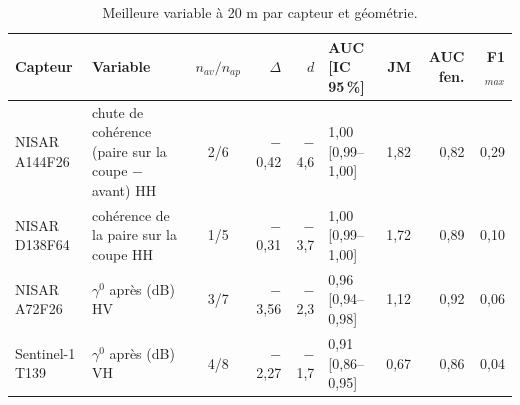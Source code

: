 \begin{table}[htbp]
\centering
\scriptsize
\caption{Meilleure variable à 20 m par capteur et géométrie.}
\label{tab-best}
\begin{tabular}{llcrrlrrr}
\toprule
Capteur & Variable & $n_{av}/n_{ap}$ & $\Delta$ & $d$ & AUC [IC 95\,\%] & JM & AUC fen. & F1$_{max}$ \\
\midrule
NISAR A144F26 & chute de cohérence (paire sur la coupe $-$ avant) HH & 2/6 & $-$0{,}42 & $-$4{,}6 & 1{,}00 [0{,}99--1{,}00] & 1{,}82 & 0{,}82 & 0{,}29 \\
\addlinespace
NISAR D138F64 & cohérence de la paire sur la coupe HH & 1/5 & $-$0{,}31 & $-$3{,}7 & 1{,}00 [0{,}99--1{,}00] & 1{,}72 & 0{,}89 & 0{,}10 \\
\addlinespace
NISAR A72F26 & $\gamma^0$ après (dB) HV & 3/7 & $-$3{,}56 & $-$2{,}3 & 0{,}96 [0{,}94--0{,}98] & 1{,}12 & 0{,}92 & 0{,}06 \\
\addlinespace
Sentinel-1 T139 & $\gamma^0$ après (dB) VH & 4/8 & $-$2{,}27 & $-$1{,}7 & 0{,}91 [0{,}86--0{,}95] & 0{,}67 & 0{,}86 & 0{,}04 \\
\bottomrule
\end{tabular}
\end{table}
